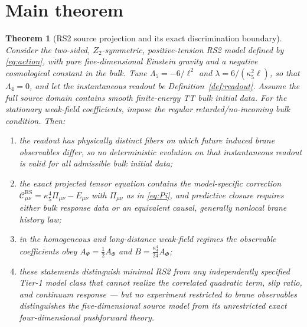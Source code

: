\documentclass[11pt,a4paper]{article}
\theoremstyle{plain}
\newtheorem{theorem}{Theorem}[section]
\theoremstyle{definition}
\newcommand{\kfive}{\kappa_5}
\newcommand{\kfour}{\kappa_4}
\newcommand{\Lfive}{\Lambda_5}
\newcommand{\Lfour}{\Lambda_4}
\newcommand{\RS}{\mathrm{RS}}
\begin{document}
\section{Main theorem}
\label{sec:main}

\begin{theorem}[RS2 source projection and its exact discrimination boundary]
\label{thm:main}
Consider the two-sided, $Z_2$-symmetric, positive-tension RS2 model
defined by \eqref{eq:action}, with pure five-dimensional Einstein gravity
and a negative cosmological constant in the bulk. Tune
$\Lfive=-6/\ell^2$ and $\lambda=6/(\kfive^2\ell)$, so that $\Lfour=0$,
and let the instantaneous readout be Definition~\ref{def:readout}.
Assume the full source domain contains smooth finite-energy TT bulk
initial data. For the stationary weak-field coefficients, impose the
regular retarded/no-incoming bulk condition. Then:
\begin{enumerate}[leftmargin=*]
\item the readout has physically distinct fibers on which future induced
brane observables differ, so no deterministic evolution on that
instantaneous readout is valid for all admissible bulk initial data;
\item the exact projected tensor equation contains the model-specific
correction
$\mathcal C^{\RS}_{\mu\nu}=\kfive^4\Pi_{\mu\nu}-E_{\mu\nu}$
with $\Pi_{\mu\nu}$ as in \eqref{eq:Pi}, and predictive closure requires
either bulk response data or an equivalent causal, generally nonlocal
brane history law;
\item in the homogeneous and long-distance weak-field regimes the
observable coefficients obey
$A_\Psi=\tfrac12A_\Phi$ and $B=\tfrac{\kfour^4}{24}A_\Phi$;
\item these statements distinguish minimal RS2 from any independently
specified Tier-1 model class that cannot realize the correlated quadratic
term, slip ratio, and continuum response --- but no experiment restricted
to brane observables distinguishes the five-dimensional source model from
its \emph{unrestricted} exact four-dimensional pushforward theory.
\end{enumerate}
\end{theorem}
\end{document}
